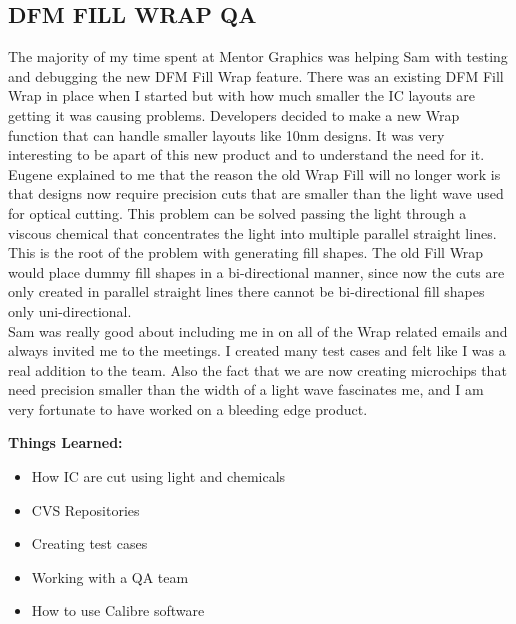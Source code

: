 \documentclass[letterpaper,10pt,notitlepage,fleqn]{article}
\begin{document}
\subsection{DFM FILL WRAP QA}
\indent The majority of my time spent at Mentor Graphics was helping Sam with testing and 
debugging the new DFM Fill Wrap feature. There was an existing DFM Fill Wrap in place 
when I started but with how much smaller the IC layouts are getting it was causing 
problems. Developers decided to make a new Wrap function that can handle smaller 
layouts like 10nm designs. It was very interesting to be apart of this new product 
and to understand the need for it.
\\
\indent Eugene explained to me that the reason the old Wrap Fill will no longer 
work is that designs now require precision cuts that are smaller than the light wave used for 
optical cutting. This problem can be solved passing 
the light through a viscous chemical that concentrates the light into multiple 
parallel straight lines. This is the root of the problem with generating fill shapes. 
The old Fill Wrap would place dummy fill shapes in a bi-directional 
manner, since now the cuts are only created in parallel straight lines there 
cannot be bi-directional fill shapes only uni-directional. 
\\
\indent  Sam was really good about including me in on all of the Wrap related 
emails and always invited me to the meetings. I created many test cases 
and felt like I was a real addition to the team. Also the fact that we are 
now creating microchips that need precision smaller than the width of a light wave 
fascinates me, and I am very fortunate to have worked on a bleeding edge product. 

\textbf{Things Learned:}
\begin{itemize} 
        \item How IC are cut using light and chemicals
        \item CVS Repositories
        \item Creating test cases
        \item Working with a QA team
        \item How to use Calibre software
    \end{itemize}
\end{document}
